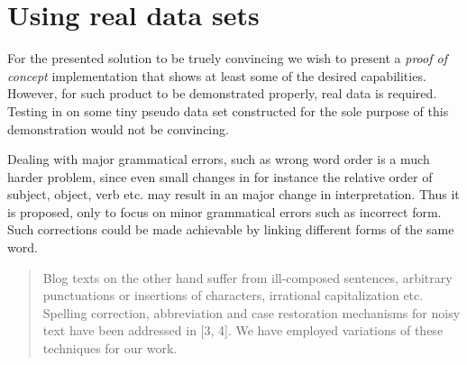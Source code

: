\clearpage

\section{Using real data sets}


For the presented solution to be truely convincing we wish to present a \emph{proof of concept} implementation that shows at least some of the desired capabilities. However, for such product to be demonstrated properly, real data is required. Testing in on some tiny pseudo data set constructed for the sole purpose of this demonstration would not be convincing.



Dealing with major grammatical errors, such as wrong word order is a much harder problem, since even small changes in for instance the relative order of subject, object, verb etc. may result in an major change in interpretation. Thus it is proposed, only to focus on minor grammatical errors such as incorrect form. Such corrections could be made achievable by linking different forms of the same word.

\begin{quote}
	Blog texts on the other hand suffer from ill-composed sentences, 
arbitrary punctuations or insertions of characters, irrational 
capitalization etc. Spelling correction, abbreviation and case 
restoration mechanisms for noisy text have been addressed in [3, 
4]. We have employed variations of these techniques for our 
work.
\end{quote}

